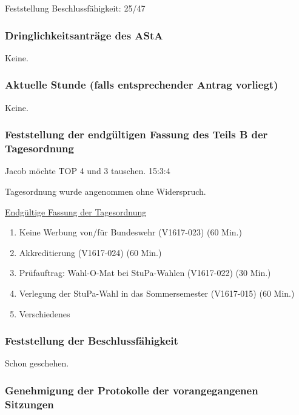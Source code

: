 \documentclass[ngerman,headheight=70pt]{scrartcl}
\begin{document}
    Feststellung Beschlussfähigkeit: 25/47

    \subsubsection{Dringlichkeitsanträge des AStA}

    Keine.

    \subsubsection{Aktuelle Stunde (falls entsprechender Antrag vorliegt)}

    Keine.

    \subsubsection{Feststellung der endgültigen Fassung des Teils B der Tagesordnung}

    Jacob möchte TOP 4 und 3 tauschen. 15:3:4

    Tagesordnung wurde angenommen ohne Widerspruch.

    \underline{Endgültige Fassung der Tagesordnung}
    \begin{enumerate}[label={\textbf{Top \theenumi}},leftmargin=*]
        \item Keine Werbung von/für Bundeswehr (V1617-023) (60 Min.)
        \item Akkreditierung (V1617-024) (60 Min.)
        \item Prüfauftrag: Wahl-O-Mat bei StuPa-Wahlen (V1617-022) (30 Min.)
        \item Verlegung der StuPa-Wahl in das Sommersemester (V1617-015) (60 Min.)
        \item Verschiedenes
    \end{enumerate}

    \subsubsection{Feststellung der Beschlussfähigkeit}

    Schon geschehen.

    \subsubsection{Genehmigung der Protokolle der vorangegangenen Sitzungen}
\end{document}
